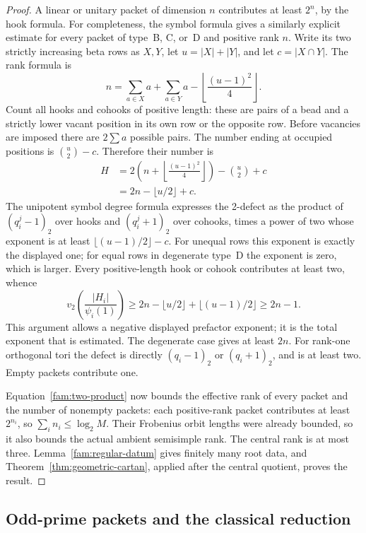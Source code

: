 \begin{proof}
A linear or unitary packet of dimension \(n\) contributes at least
\(2^n\), by the hook formula.  For completeness, the symbol formula
gives a similarly explicit estimate for every packet of type~B, C, or~D
and positive rank \(n\).  Write its two strictly increasing beta rows
as \(X,Y\), let \(u=|X|+|Y|\), and let \(c=|X\cap Y|\).
The rank formula is
\[
 n=\sum_{a\in X}a+\sum_{a\in Y}a
                  -\left\lfloor\frac{(u-1)^2}{4}\right\rfloor.
\]
Count all hooks and cohooks of positive length: these are pairs
of a bead and a strictly lower vacant position in its own row
or the opposite row.  Before vacancies are imposed there are
\(2\sum a\) possible pairs.  The number ending at occupied
positions is \(\binom u2-c\).  Therefore their number is
\begin{align*}
 H&=2\left(n+\left\lfloor\frac{(u-1)^2}{4}\right\rfloor\right)
                 -\binom u2+c\\
  &=2n-\lfloor u/2\rfloor+c.
\end{align*}
The unipotent symbol degree formula \cite[Section~3.3]{LMT}
expresses the 2-defect as the product of
\((q_i^j-1)_2\) over hooks and \((q_i^j+1)_2\) over cohooks,
times a power of two whose exponent is at least
\(\lfloor(u-1)/2\rfloor-c\).
For unequal rows this exponent is exactly the displayed one;
for equal rows in degenerate type~D the exponent is zero, which
is larger.  Every positive-length hook or cohook contributes
at least two, whence
\[
 v_2\!\left(\frac{|H_i|}{\psi_i(1)}\right)
 \geq 2n-\lfloor u/2\rfloor+\lfloor(u-1)/2\rfloor
 \geq 2n-1.
\]
This argument allows a negative displayed prefactor exponent;
it is the total exponent that is estimated.  The degenerate
case gives at least \(2n\).  For rank-one orthogonal tori the
defect is directly \((q_i-1)_2\) or \((q_i+1)_2\), and is at
least two.  Empty packets contribute one.

Equation~\eqref{fam:two-product} now bounds the effective rank
of every packet and the number of nonempty packets: each
positive-rank packet contributes at least \(2^{n_i}\), so
\(\sum_i n_i\leq\log_2 M\).  Their
Frobenius orbit lengths were already bounded, so it also bounds
the actual ambient semisimple rank.  The central rank is at
most three.  Lemma~\ref{fam:regular-datum} gives finitely many
root data, and Theorem~\ref{thm:geometric-cartan}, applied after
the central quotient, proves the result.
\end{proof}

\subsection{Odd-prime packets and the classical reduction}

